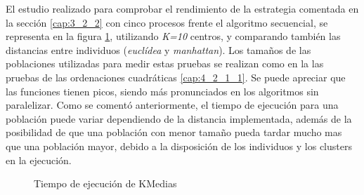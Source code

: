 		El estudio realizado para comprobar el rendimiento de la estrategia comentada en la sección \ref{cap:3_2_2} con cinco procesos frente el algoritmo secuencial, se representa en la figura \ref{fig:KMedias}, utilizando \textit{K=10} centros, y comparando también las distancias entre individuos (\textit{euclídea} y \textit{manhattan}). Los tamaños de las poblaciones utilizadas para medir estas pruebas se realizan como en la las pruebas de las ordenaciones cuadráticas \ref{cap:4_2_1_1}. Se puede apreciar que las funciones tienen picos, siendo más pronunciados en los algoritmos sin paralelizar. Como se comentó anteriormente, el tiempo de ejecución para una población puede variar dependiendo de la distancia implementada, además de la posibilidad de que una población con menor tamaño pueda tardar mucho mas que una población mayor, debido a la disposición de los individuos y los clusters en la ejecución. 						
	
	
			\begin{figure}[!h]
			\centering
			\caption{Tiempo de ejecución de KMedias}
			\label{fig:KMedias}
			\end{figure}
			
